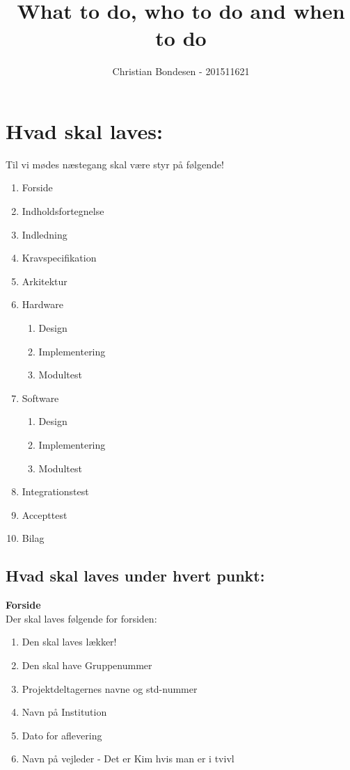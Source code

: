 \documentclass[11pt]{article}
\title{What to do, who to do and when to do}
\author{Christian Bondesen - 201511621}
\begin{document}
\maketitle
\section{Hvad skal laves:}

Til vi mødes næstegang skal være styr på følgende!

\begin{enumerate}
	\item Forside 
	\item Indholdsfortegnelse
	\item Indledning
	\item Kravspecifikation
	\item Arkitektur
	
	\item Hardware
	\begin{enumerate}
		\item Design
		\item Implementering
		\item Modultest
	\end{enumerate}

	\item Software	
	\begin{enumerate}
		\item Design
		\item Implementering
		\item Modultest
	\end{enumerate}
	\item Integrationstest
	\item Accepttest
	\item Bilag
\end{enumerate}

\subsection{Hvad skal laves under hvert punkt: }

\textbf{Forside}\\

Der skal laves følgende for forsiden:
\begin{enumerate}
	\item Den skal laves lækker!
	\item Den skal have Gruppenummer
	\item Projektdeltagernes navne og std-nummer
	\item Navn på Institution
	\item Dato for aflevering
	\item Navn på vejleder - Det er Kim hvis man er i tvivl
\end{enumerate}
\end{document}

